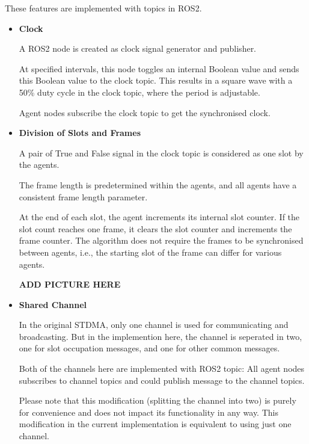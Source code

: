 These features are implemented with topics in ROS2\footnotemark. 
\begin{itemize}
    \item \textbf{Clock}
    
    A ROS2 node is created as clock signal generator and publisher.

    At specified intervals, this node toggles an internal Boolean value and sends this Boolean value to the clock topic. This results in a square wave with a 50\% duty cycle in the clock topic, where the period is adjustable.

    Agent nodes subscribe the clock topic to get the synchronised clock.

    \item \textbf{Division of Slots and Frames}
    
    A pair of True and False signal in the clock topic is considered as one slot by the agents.

    The frame length is predetermined within the agents, and all agents have a consistent frame length parameter.
    
    At the end of each slot, the agent increments its internal slot counter. If the slot count reaches one frame, it clears the slot counter and increments the frame counter. The algorithm does not require the frames to be synchronised between agents, i.e., the starting slot of the frame can differ for various agents.
    
    \textbf{ADD PICTURE HERE}

    \item \textbf{Shared Channel}
    
    In the original STDMA\cite{STDMA}, only one channel is used for communicating and broadcasting. 
    But in the implemention here, the channel is seperated in two, one for slot occupation messages, and one for other common messages. 

    Both of the channels here are implemented with ROS2 topic: All agent nodes subscribes to channel topics and could publish message to the channel topics.    

    Please note that this modification (splitting the channel into two) is purely for convenience and does not impact its functionality in any way.
    This modification in the current implementation is equivalent to using just one channel.    

\end{itemize}


